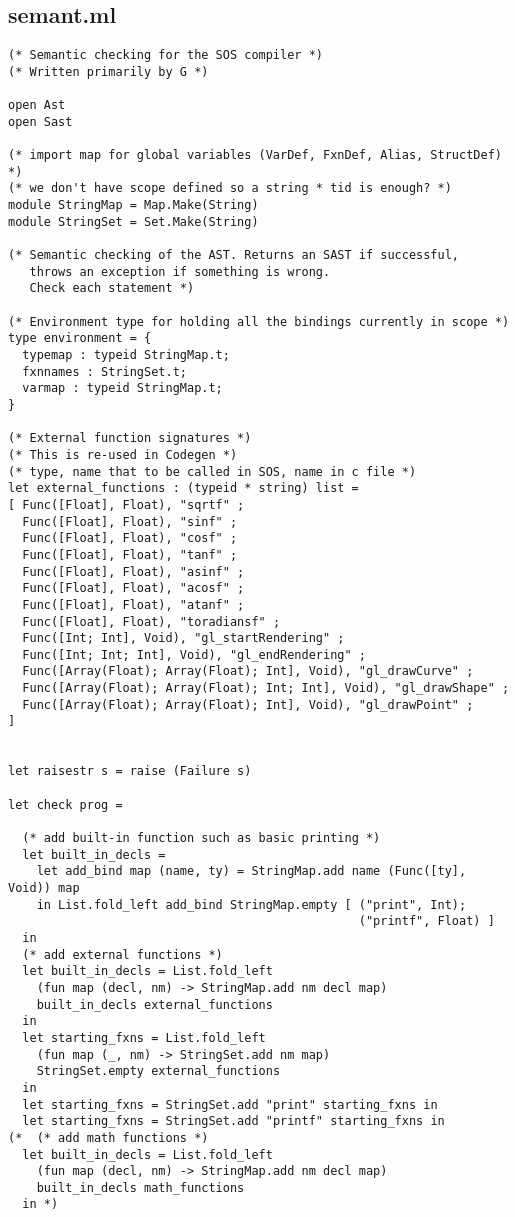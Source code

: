 \documentclass[main.tex]{subfiles}
\begin{document}
\subsection{semant.ml}
\begin{lstlisting}
(* Semantic checking for the SOS compiler *)
(* Written primarily by G *)

open Ast
open Sast

(* import map for global variables (VarDef, FxnDef, Alias, StructDef) *)
(* we don't have scope defined so a string * tid is enough? *)
module StringMap = Map.Make(String)
module StringSet = Set.Make(String)

(* Semantic checking of the AST. Returns an SAST if successful,
   throws an exception if something is wrong.
   Check each statement *)

(* Environment type for holding all the bindings currently in scope *)
type environment = {
  typemap : typeid StringMap.t;
  fxnnames : StringSet.t;
  varmap : typeid StringMap.t;
}

(* External function signatures *)
(* This is re-used in Codegen *)
(* type, name that to be called in SOS, name in c file *)
let external_functions : (typeid * string) list =
[ Func([Float], Float), "sqrtf" ;
  Func([Float], Float), "sinf" ;
  Func([Float], Float), "cosf" ;
  Func([Float], Float), "tanf" ;
  Func([Float], Float), "asinf" ;
  Func([Float], Float), "acosf" ;
  Func([Float], Float), "atanf" ;
  Func([Float], Float), "toradiansf" ;
  Func([Int; Int], Void), "gl_startRendering" ;
  Func([Int; Int; Int], Void), "gl_endRendering" ;
  Func([Array(Float); Array(Float); Int], Void), "gl_drawCurve" ;
  Func([Array(Float); Array(Float); Int; Int], Void), "gl_drawShape" ;
  Func([Array(Float); Array(Float); Int], Void), "gl_drawPoint" ;
]


let raisestr s = raise (Failure s) 

let check prog =

  (* add built-in function such as basic printing *)
  let built_in_decls =
    let add_bind map (name, ty) = StringMap.add name (Func([ty], Void)) map 
    in List.fold_left add_bind StringMap.empty [ ("print", Int);
                                                 ("printf", Float) ]
  in
  (* add external functions *)
  let built_in_decls = List.fold_left
    (fun map (decl, nm) -> StringMap.add nm decl map)
    built_in_decls external_functions
  in
  let starting_fxns = List.fold_left
    (fun map (_, nm) -> StringSet.add nm map)
    StringSet.empty external_functions
  in
  let starting_fxns = StringSet.add "print" starting_fxns in
  let starting_fxns = StringSet.add "printf" starting_fxns in
(*  (* add math functions *)
  let built_in_decls = List.fold_left
    (fun map (decl, nm) -> StringMap.add nm decl map)
    built_in_decls math_functions
  in *)


\end{lstlisting}
\end{document}
